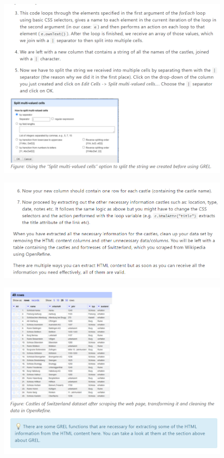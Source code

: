 \begin{figure}[H]
    \includegraphics[width=\linewidth]{./Figures/Appendices/worksheet/56.png}
\end{figure}
\begin{figure}[H]
    \includegraphics[width=\linewidth]{./Figures/Appendices/worksheet/57.png}
\end{figure}
\begin{figure}[H]
    \includegraphics[width=\linewidth]{./Figures/Appendices/worksheet/58.png}
\end{figure}
